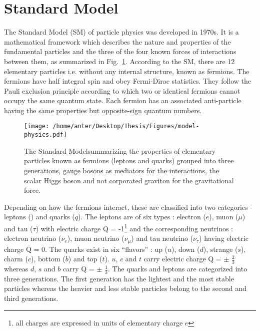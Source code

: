 \section{Standard Model}
The Standard Model (SM) of particle physics \cite{Perkins:1982xb,Herrero:1998eq,Weinberg:1967tq} was developed in 1970s. It is a mathematical framework which describes the nature and properties of the fundamental particles and the three of the four known forces of interactions between them, as summarized in Fig.~\ref{fig:SM}. According to the SM, there are 12 elementary particles i.e. without any internal structure, known as fermions. The fermions have half integral spin and obey Fermi-Dirac statistics. They follow the Pauli exclusion principle according to which two or identical fermions cannot occupy the same quantum state. Each fermion has an associated anti-particle having the same properties but opposite-sign quantum numbers.
\begin{figure}[!h]
\begin{center}
\hspace*{-15mm}
\texttt{[image: /home/anter/Desktop/Thesis/Figures/model-physics.pdf]}\\
\caption[The Standard Model summarizing the properties of elementary particles and their forces of interaction.]{The Standard Model\footnotemark summarizing the properties of elementary particles known as fermions (leptons and quarks) grouped into three generations, gauge bosons as mediators for the interactions, the scalar Higgs boson and not corporated graviton for the gravitational force.}
\label{fig:SM}
\end{center}
\end{figure}
Depending on how the fermions interact, these are classified into two categories - leptons (\sln) and quarks ($q$). The leptons are of six types : electron ($e$), muon ($\mu$) and tau ($\tau$) with electric charge Q = -1\footnote{all charges are expressed in units of elementary charge $e$} and the corresponding neutrinos : electron neutrino ($\nu_e$), muon neutrino ($\nu_\mu$) and tau neutrino ($\nu_\tau$) having electric charge Q = 0. The quarks exist in six ``flavors'' : up ($u$), down ($d$), strange ($s$), charm ($c$), bottom ($b$) and top ($t$). $u$, $c$ and $t$ carry electric charge Q = $\pm$ $\frac{2}{3}$ whereas $d$, $s$ and $b$ carry Q = $\pm$ $\frac{1}{3}$. The quarks and leptons are categorized into three generations. The first generation has the lightest and the most stable particles whereas the heavier and less stable particles belong to the second and third generations.

